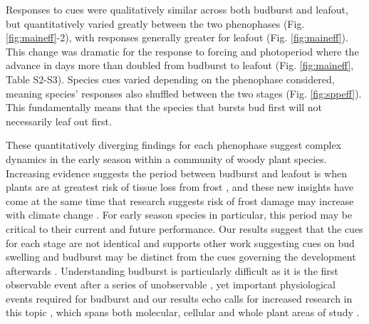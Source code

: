 \documentclass[11pt]{article}
\begin{document}
Responses to cues were qualitatively similar across both budburst and leafout, but quantitatively varied greatly between the two phenophases (Fig. \ref{fig:maineff}-2), with responses generally greater for leafout (Fig. \ref{fig:maineff}). This change was dramatic for the response to forcing and photoperiod where the advance in days more than doubled from budburst to leafout (Fig. \ref{fig:maineff}, Table S2-S3). Species cues varied depending on the phenophase considered, meaning species' responses also shuffled between the two stages (Fig. \ref{fig:sppeff}). This fundamentally means that the species that bursts bud first will not necessarily leaf out first. 

These quantitatively diverging findings for each phenophase suggest complex dynamics in the early season within a community of woody plant species. Increasing evidence suggests the period between budburst and leafout is when plants are at greatest risk of tissue loss from frost \citep{Lenz:2013aa}, and these new insights have come at the same time that research suggests risk of frost damage may increase with climate change \citep{Augspurger:2009gj,Dai2013}. For early season species in particular, this period may be critical to their current and future performance. Our results suggest that the cues for each stage are not identical and supports other work suggesting cues on bud swelling and budburst may be distinct from the cues governing the development afterwards \citep{Basler:2014aa}. Understanding budburst is particularly difficult as it is the first observable event after a series of unobservable \citep[but see][]{rinne2011}, yet important physiological events required for budburst \citep{Caffarra:2011aa,vitasse2014rev} and our results echo calls for increased research in this topic \citep{chuine2016}, which spans both molecular, cellular and whole plant areas of study \citep{Morin:2009,rinne2011,singh2017}. 
\end{document}
